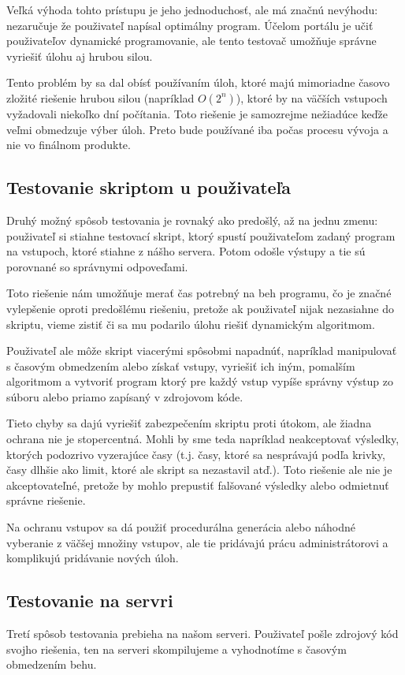  Veľká výhoda tohto prístupu je jeho jednoduchosť, ale má značnú nevýhodu: nezaručuje že použivateľ napísal optimálny program.
Účelom portálu je učiť použivateľov dynamické programovanie, ale tento testovač umožňuje správne vyriešiť úlohu aj hrubou silou.

Tento problém by sa dal obísť používaním úloh, ktoré majú mimoriadne časovo zložité riešenie hrubou silou (napríklad \(O(2^n)\)), ktoré by na väčších vstupoch
vyžadovali niekoľko dní počítania.
Toto riešenie je samozrejme nežiadúce keďže veľmi obmedzuje výber úloh. Preto bude používané iba počas procesu vývoja a nie vo finálnom produkte.

\subsection{Testovanie skriptom u použivateľa}

\label{testovac2}
Druhý možný spôsob testovania je rovnaký ako predošlý, až na jednu zmenu: použivateľ si stiahne testovací skript, ktorý spustí použivateľom zadaný program
na vstupoch, ktoré stiahne z nášho servera. Potom odošle výstupy a tie sú porovnané so správnymi odpoveďami.

Toto riešenie nám umožňuje merať čas potrebný na beh programu, čo je značné vylepšenie oproti predošlému riešeniu, pretože ak použivateľ nijak nezasiahne
do skriptu, vieme zistiť či sa mu podarilo úlohu riešiť dynamickým algoritmom.

Použivateľ ale môže skript viacerými spôsobmi napadnúť, napríklad manipulovať s časovým obmedzením alebo získať vstupy, vyriešiť ich iným, pomalším algoritmom a
vytvoriť program ktorý pre každý vstup vypíše správny výstup zo súboru alebo priamo zapísaný v zdrojovom kóde.

Tieto chyby sa dajú vyriešiť zabezpečením skriptu proti útokom, ale žiadna ochrana nie je stopercentná. Mohli by sme teda napríklad neakceptovať výsledky, ktorých podozrivo vyzerajúce
časy (t.j. časy, ktoré sa nesprávajú podľa krivky, časy dlhšie ako limit, ktoré ale skript sa nezastavil atď.). Toto riešenie ale nie je akceptovateľné, pretože by mohlo prepustiť
falšované výsledky alebo odmietnuť správne riešenie.

Na ochranu vstupov sa dá použiť procedurálna generácia alebo náhodné vyberanie z väčšej množiny vstupov, ale tie pridávajú prácu administrátorovi a komplikujú pridávanie nových úloh.

\subsection{Testovanie na servri}
Tretí spôsob testovania prebieha na našom serveri. Použivateľ pošle zdrojový kód svojho riešenia, ten na serveri skompilujeme a vyhodnotíme s časovým obmedzením behu.

